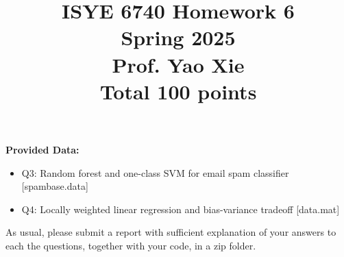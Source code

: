 \documentclass[twoside,10pt]{article}
\begin{document}
\title{ISYE 6740 Homework 6 \\ 
Spring 2025\\ 
Prof. Yao Xie\\
 Total 100 points}
\date{}
\maketitle





\textbf{Provided Data:}
\begin{itemize}
    \item Q3: Random forest and one-class SVM for email spam classifier [spambase.data]
    \item Q4: Locally weighted linear regression and bias-variance tradeoff [data.mat]
\end{itemize}
As usual, please submit a report with sufficient explanation of your answers to each the questions, together with your code, in a zip folder.
\end{document}
